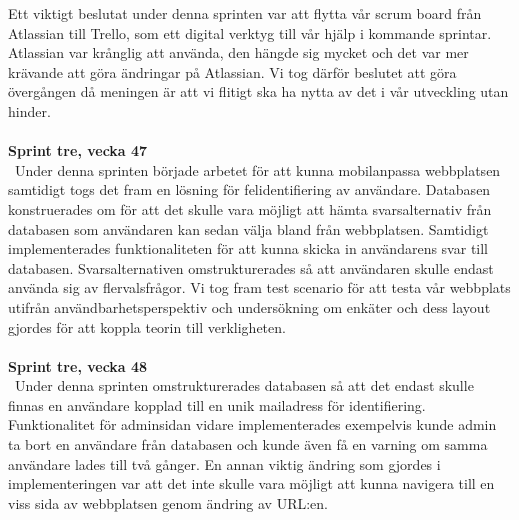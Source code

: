 \documentclass[12pt]{article}
\begin{document}
Ett viktigt beslutat under denna sprinten var att flytta vår scrum board från Atlassian till Trello, som ett digital verktyg till vår hjälp i kommande sprintar. Atlassian var krånglig att använda, den hängde sig mycket och det var mer krävande att göra ändringar på Atlassian. Vi tog därför beslutet att göra övergången då meningen är att vi flitigt ska ha nytta av det i vår utveckling utan hinder.\\\\
\textbf{Sprint tre, vecka 47} \\\
Under denna sprinten började arbetet för att kunna mobilanpassa webbplatsen samtidigt togs det fram en lösning för felidentifiering av användare. Databasen konstruerades om för att det skulle vara möjligt att hämta svarsalternativ från databasen som användaren kan sedan välja bland från webbplatsen. Samtidigt implementerades funktionaliteten för att kunna skicka in användarens svar till databasen. Svarsalternativen omstrukturerades så att användaren skulle endast använda sig av flervalsfrågor. Vi tog fram test scenario för att testa vår webbplats utifrån användbarhetsperspektiv och undersökning om enkäter och dess layout gjordes för att koppla teorin till verkligheten.\\\\
\textbf{Sprint tre, vecka 48} \\\
Under denna sprinten omstrukturerades databasen så att det endast skulle finnas en användare kopplad till en unik mailadress för identifiering. Funktionalitet för adminsidan vidare implementerades exempelvis kunde admin ta bort en användare från databasen och kunde även få en varning om samma användare lades till två gånger. En annan viktig ändring som gjordes i implementeringen var att det inte skulle vara möjligt att kunna navigera till en viss sida av webbplatsen genom ändring av URL:en. 
\end{document}

